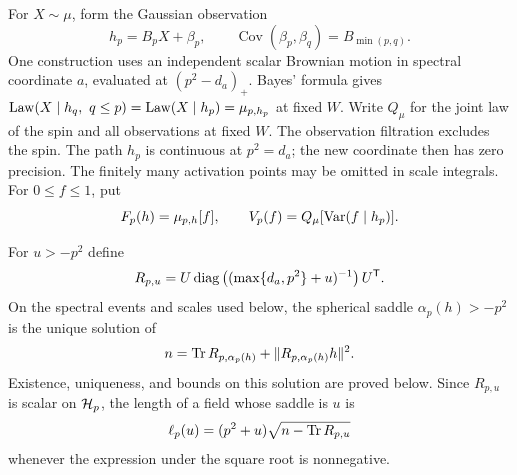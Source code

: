 For \(X\sim\mu\), form the Gaussian observation
\begin{equation}\label{edge:observation}
 h_p=B_pX+\beta_p,\qquad
 \operatorname{Cov}(\beta_p,\beta_q)=B_{\min(p,q)}.
\end{equation}
One construction uses an independent scalar Brownian motion in spectral
coordinate \(a\), evaluated at \((p^2-d_a)_+\).  Bayes' formula gives
\(\operatorname{Law}(X\mid h_q,\ q\le p)=\operatorname{Law}(X\mid h_p)=\mu_{p,h_p}\) at fixed \(W\).
Write \(Q_\mu\) for the joint law of
the spin and all observations at fixed \(W\).  The observation filtration
excludes the spin.  The path \(h_p\) is continuous at \(p^2=d_a\); the
new coordinate then has zero precision.  The finitely many activation
points may be omitted in scale integrals.  For \(0\le f\le1\), put
\begin{equation}\label{edge:posterior-variance}
 F_p(h)=\mu_{p,h}[f],\qquad
 V_p(f)=Q_\mu[\operatorname{Var}(f\mid h_p)].
\end{equation}

For \(u>-p^2\) define
\[
 R_{p,u}=U\operatorname{diag}\left((\max\{d_a,p^2\}+u)^{-1}\right)U^{\mathsf T}.
\]
On the spectral events and scales used below, the spherical saddle
\(\alpha_p(h)>-p^2\) is the unique solution of
\begin{equation}\label{edge:saddle}
 n=\operatorname{Tr} R_{p,\alpha_p(h)}+\|R_{p,\alpha_p(h)}h\|^2.
\end{equation}
Existence, uniqueness, and bounds on this solution are proved below.
Since \(R_{p,u}\) is scalar on \(\mathcal H_p\), the length of a field whose
saddle is \(u\) is
\begin{equation}\label{edge:saddle-length}
 \ell_p(u)=(p^2+u)\sqrt{n-\operatorname{Tr} R_{p,u}}
\end{equation}
whenever the expression under the square root is nonnegative.

